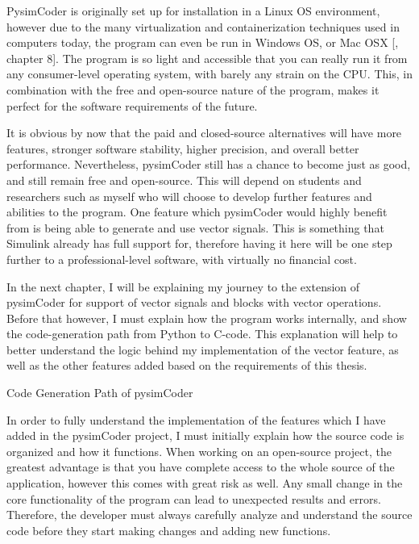 \quad PysimCoder is originally set up for installation in a Linux OS environment, however due to the many virtualization and
containerization techniques used in computers today, the program can even be run in Windows OS, or Mac OSX [,
chapter 8]. The program is so light and accessible that you can really run it from any consumer-level operating system, with barely
any strain on the CPU. This, in combination with the free and open-source nature of the program, makes it perfect for the software
requirements of the future.

\quad It is obvious by now that the paid and closed-source alternatives will have more features, stronger software stability, higher
precision, and overall better performance. Nevertheless, pysimCoder still has a chance to become just as good, and still remain free
and open-source. This will depend on students and researchers such as myself who will choose to develop further features and
abilities to the program. One feature which pysimCoder would highly benefit from is being able to generate and use vector signals.
This is something that Simulink already has full support for, therefore having it here will be one step further to a
professional-level software, with virtually no financial cost.

\quad In the next chapter, I will be explaining my journey to the extension of pysimCoder for support of vector
signals and blocks with vector operations. Before that however, I must explain how the program works internally, and show the
code-generation path from Python to C-code. This explanation will help to better understand the logic behind my implementation
of the vector feature, as well as the other features added based on the requirements of this thesis.



\sec Code Generation Path of pysimCoder

\qquad In order to fully understand the implementation of the features which I have added in the pysimCoder project,
I must initially explain how the source code is organized and how it functions. When working on an open-source project,
the greatest advantage is that you have complete access to the whole source of the application, however this comes
with great risk as well. Any small change in the core functionality of the program can lead to unexpected results
and errors. Therefore, the developer must always carefully analyze and understand the source code before they start
making changes and adding new functions.


